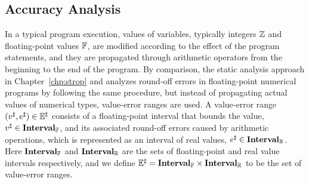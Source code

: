 \subsection{Accuracy Analysis}
\label{sub:accuracy_analysis}

In a typical program execution, values of variables, typically integers
$\mathbb{Z}$ and floating-point values $\mathbb{F}$, are modified according
to the effect of the program statements, and they are propagated through
arithmetic operators from the beginning to the end of the program.  By
comparison, the static analysis approach in Chapter~\ref{chp:strop} and
\cite{martel07} analyzes round-off errors in floating-point numerical
programs by following the same procedure, but instead of propagating actual
values of numerical types, value-error ranges are used.  A value-error range
$(v^\sharp, e^\sharp) \in \mathbb{E}^\sharp$ consists of a floating-point interval that
bounds the value, $v^\sharp \in \mathbf{Interval}_\mathbb{F}$, and its associated
round-off errors caused by arithmetic operations, which is represented as
an interval of real values, $e^\sharp \in \mathbf{Interval}_\mathbb{R}$.  Here
$\mathbf{Interval}_\mathbb{F}$ and $\mathbf{Interval}_\mathbb{R}$ are the sets of
floating-point and real value intervals respectively, and we define $\mathbb{E}^\sharp
= \mathbf{Interval}_\mathbb{F} \times \mathbf{Interval}_\mathbb{R}$ to be the set of
value-error ranges.

